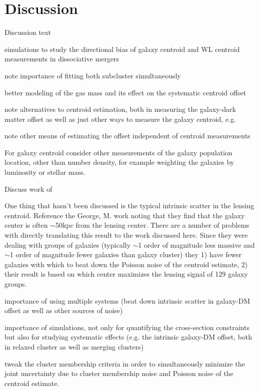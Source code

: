 \section{Discussion}

Discussion text

simulations to study the directional bias of galaxy centroid and WL centroid measurements in dissociative mergers


note importance of fitting both subcluster simultaneously

better modeling of the gas mass and its effect on the systematic centroid offset

note alternatives to centroid estimation, both in measuring the galaxy-dark matter offset as well as just other ways to measure the galaxy centroid, e.g. \citep{Randall:2008hs}

note other means of estimating the offset independent of centroid measurements

For galaxy centroid consider other measurements of the galaxy population location, other than number density, for example weighting the galaxies by luminosity or stellar mass.

Discuss work of \citep{Kahlhoefer:2013wp}

One thing that hasn't been discussed is the typical intrinsic scatter in the lensing centroid. Reference the George, M. work noting that they find that the galaxy center is often $\sim$50kpc from the lensing center. There are a number of problems with directly translating this result to the work discussed here. Since they were dealing with groups of galaxies (typically $\sim$1 order of magnitude less massive and $\sim$1 order of magnitude fewer galaxies than galaxy cluster) they 1) have fewer galaxies with which to beat down the Poisson noise of the centroid estimate, 2) their result is based on which center maximizes the lensing signal of 129 galaxy groups. 

importance of using multiple systems (beat down intrinsic scatter in galaxy-DM offset as well as other sources of noise)

importance of simulations, not only for quantifying the cross-section constraints but also for studying systematic effects (e.g. the intrinsic galaxy-DM offset, both in relaxed cluster as well as merging clusters)

tweak the cluster membership criteria in order to simultaneously minimize the joint uncertainty due to cluster membership noise and Poisson noise of the centroid estimate.

